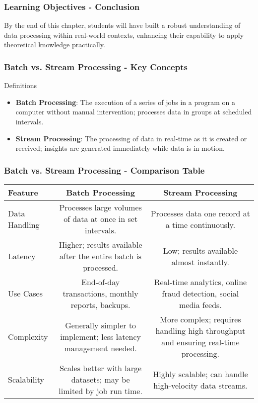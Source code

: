\documentclass{beamer}
\begin{document}
\begin{frame}[fragile]
    \frametitle{Learning Objectives - Conclusion}
    By the end of this chapter, students will have built a robust understanding of data processing within real-world contexts, enhancing their capability to apply theoretical knowledge practically.
\end{frame}

\begin{frame}[fragile]
    \frametitle{Batch vs. Stream Processing - Key Concepts}
    
    \begin{block}{Definitions}
        \begin{itemize}
            \item \textbf{Batch Processing}: The execution of a series of jobs in a program on a computer without manual intervention; processes data in groups at scheduled intervals.
            \item \textbf{Stream Processing}: The processing of data in real-time as it is created or received; insights are generated immediately while data is in motion.
        \end{itemize}
    \end{block}
\end{frame}

\begin{frame}[fragile]
    \frametitle{Batch vs. Stream Processing - Comparison Table}
    
    \begin{center}
        \begin{tabular}{|l|c|c|}
            \hline
            \textbf{Feature} & \textbf{Batch Processing} & \textbf{Stream Processing} \\
            \hline
            Data Handling & Processes large volumes of data at once in set intervals. & Processes data one record at a time continuously. \\
            \hline
            Latency & Higher; results available after the entire batch is processed. & Low; results available almost instantly. \\
            \hline
            Use Cases & End-of-day transactions, monthly reports, backups. & Real-time analytics, online fraud detection, social media feeds. \\
            \hline
            Complexity & Generally simpler to implement; less latency management needed. & More complex; requires handling high throughput and ensuring real-time processing. \\
            \hline
            Scalability & Scales better with large datasets; may be limited by job run time. & Highly scalable; can handle high-velocity data streams. \\
            \hline
        \end{tabular}
    \end{center}
\end{frame}
\end{document}
